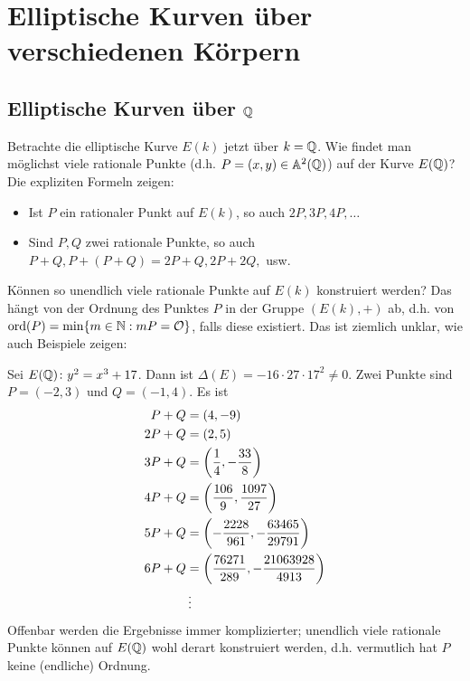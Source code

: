 \section{Elliptische Kurven über verschiedenen Körpern}
\label{sec:para3}
\nextlecture
\subsection{Elliptische Kurven über $\QQ$}
\label{sub:3.1}

\begin{mot}
	Betrachte die elliptische Kurve $E(k)$ jetzt über $k = \QQ$. \marginnote{[16]}
	Wie findet man möglichst viele rationale Punkte (d.h. $P=(x,y) \in \aff^2(\QQ)$) auf der Kurve $E(\QQ)$?
	Die expliziten Formeln zeigen:
	\begin{itemize}
		\item Ist $P$ ein rationaler Punkt auf $E(k)$, so auch $2P, 3P, 4P, \dots$
		\item Sind $P,Q$ zwei rationale Punkte, so auch $P+Q, P+(P+Q) = 2P + Q, 2P + 2Q,$ usw.
	\end{itemize}
	Können so unendlich viele rationale Punkte auf $E(k)$ konstruiert werden?
	Das hängt von der Ordnung des Punktes $P$ in der Gruppe $(E(k),+)$ ab, d.h. von $\ord(P) = \min\{m \in \NN : mP = \oh\}$, falls diese existiert.
	Das ist ziemlich unklar, wie auch Beispiele zeigen:
\end{mot}

\begin{bsp}
\label{bsp_16.2}
	Sei $E(\QQ) \colon y^2 = x^3 + 17$.
	Dann ist $\Delta(E) = -16 \cdot 27 \cdot 17^2 \neq 0$.
	Zwei Punkte sind $P = (-2,3)$ und $Q = (-1,4)$.
	Es ist
	\begin{equation}
	\begin{aligned}
		P + Q &= (4,-9) \\
		2P + Q &= (2,5) \\
		3P + Q &= \enbrace*{\frac{1}{4}, - \frac{33}{8}} \\
		4P + Q &= \enbrace*{\frac{106}{9}, \frac{1097}{27}} \\
		5P + Q &= \enbrace*{-\frac{2228}{961},-\frac{63465}{29791}}\\
		6P + Q &= \enbrace*{\frac{76271}{289},-\frac{21063928}{4913}} \\
		&\vdots
	\end{aligned}
	\end{equation}
	Offenbar werden die Ergebnisse immer komplizierter; unendlich viele rationale Punkte können auf $E(\QQ)$ wohl derart konstruiert werden, d.h. vermutlich hat $P$ keine (endliche) Ordnung.
\end{bsp}

